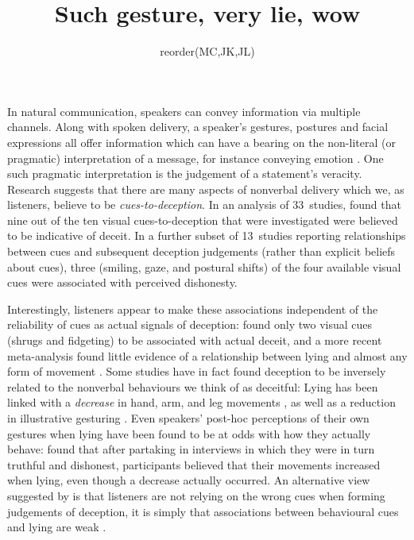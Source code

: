 \documentclass[a4paper,man,natbib]{apa6}
\title{Such gesture, very lie, wow}
\author{reorder(MC,JK,JL)}
\affiliation{Psychology, PPLS, University of Edinburgh}
\newcommand*{\term}[1]{\emph{#1}} %
\begin{document}
\maketitle
\linenumbers
\noindent
In natural communication, speakers can convey information via multiple channels.
Along with spoken delivery, a speaker's gestures, postures and facial expressions all offer information which can have a bearing on the non-literal (or pragmatic) interpretation of a message, for instance conveying emotion \citep{Busso2004, Gregersen2005}.
One such pragmatic interpretation is the judgement of a statement's veracity.
Research suggests that there are many aspects of nonverbal delivery which we, as listeners, believe to be \term{cues-to-deception}. 
In an analysis of 33~studies, \citet{Zuckerman1981} found that nine out of the ten visual cues-to-deception that were investigated were believed to be indicative of deceit. 
In a further subset of 13~studies reporting relationships between cues and subsequent deception judgements (rather than explicit beliefs about cues), three (smiling, gaze, and postural shifts) of the four available visual cues were associated with perceived dishonesty.

Interestingly, listeners appear to make these associations independent of the reliability of cues as actual signals of deception: \citet{Zuckerman1981} found only two visual cues (shrugs and fidgeting) to be associated with actual deceit, and a more recent meta-analysis found little evidence of a relationship between lying and almost any form of movement \citep{DePaulo2003}.
Some studies have in fact found deception to be inversely related to the nonverbal behaviours we think of as deceitful:
Lying has been linked with a \emph{decrease} in hand, arm, and leg movements \citep[e.g.][]{DePaulo1992, Ekman1989, Vrij1995}, as well as a reduction in illustrative gesturing \citep[e.g.][]{DePaulo2003, Cohen2010}.
Even speakers' post-hoc perceptions of their own gestures when lying have been found to be at odds with how they actually behave:
\citet{Vrij1996} found that after partaking in interviews in which they were in turn truthful and dishonest, participants believed that their movements increased when lying, even though a decrease actually occurred.
An alternative view suggested by \citet{Hartwig2011} is that listeners are not relying on the wrong cues when forming judgements of deception, it is simply that associations between behavioural cues and lying are weak \citep{Hartwig2011}.
\end{document}
